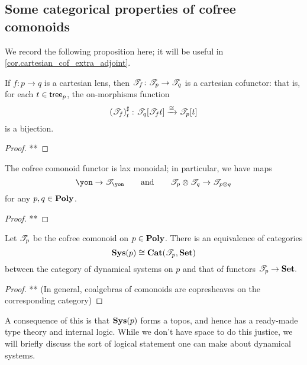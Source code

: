 \documentclass[Book-Poly]{subfiles}
\begin{document}
\subsection{Some categorical properties of cofree comonoids}

We record the following proposition here; it will be useful in \cref{cor.cartesian_cof_extra_adjoint}.

\begin{proposition}
If $f\colon p\to q$ is a cartesian lens, then $\mathscr{T}_{f}\colon\mathscr{T}_{p}\to\mathscr{T}_{q}$ is a cartesian cofunctor: that is, for each $t\in\mathsf{tree}_p$, the on-morphisms function
\[
    \left(\mathscr{T}_{f}\right)^\sharp_t\colon\mathscr{T}_{q}[\mathscr{T}_{f}t]\xrightarrow{\cong}\mathscr{T}_{p}[t]
\]
is a bijection.
\end{proposition}
\begin{proof}
**
\end{proof}

\begin{proposition}
The cofree comonoid functor is lax monoidal; in particular, we have maps
\[
\yon\to\cofree{\yon}
\qqand
\cofree{p}\otimes\cofree{q}\to\cofree{p\otimes q}
\]
for any $p,q\in\mathbf{Poly}$.
\end{proposition}
\begin{proof}
**
\end{proof}

\begin{theorem}\label{thm.cofree_coalgebras}
Let $\mathscr{T}_{p}$ be the cofree comonoid on $p\in\mathbf{Poly}$. There is an equivalence of categories
\[
\mathbf{Sys}(p)\cong\mathbf{Cat}(\mathscr{T}_{p},\mathbf{Set})
\]
between the category of dynamical systems on $p$ and that of functors $\mathscr{T}_{p}\to\mathbf{Set}.$
\end{theorem}
\begin{proof}
** (In general, coalgebras of comonoids are copresheaves on the corresponding category)
\end{proof}

A consequence of this is that $\mathbf{Sys}(p)$ forms a topos, and hence has a ready-made type theory and internal logic. While we don't have space to do this justice, we will briefly discuss the sort of logical statement one can make about dynamical systems.


\end{document}
